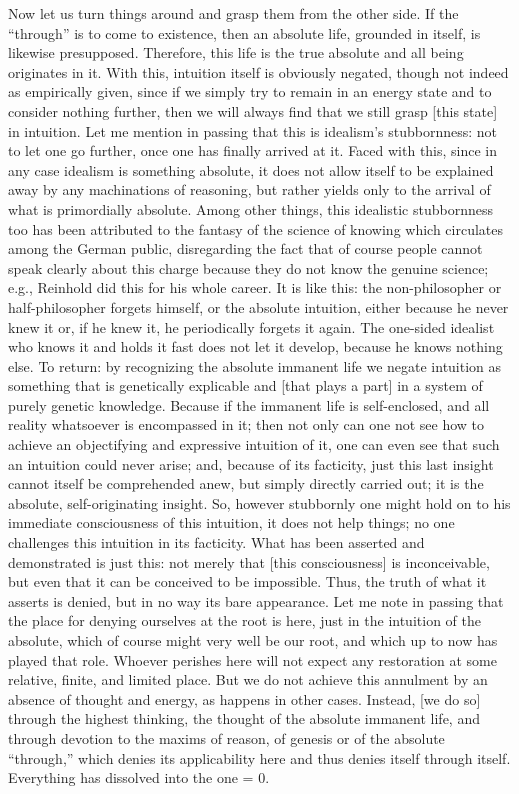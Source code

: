 Now let us turn things around
and grasp them from the other side.
If the “through” is to come to existence,
then an absolute life, grounded in itself,
is likewise presupposed.
Therefore, this life is the true absolute
and all being originates in it.
With this, intuition itself is obviously negated,
though not indeed as empirically given,
since if we simply try to remain in an energy state
and to consider nothing further,
then we will always find that we still grasp
[this state] in intuition.
Let me mention in passing that
this is idealism's stubbornness:
not to let one go further,
once one has finally arrived at it.
Faced with this, since in any case
idealism is something absolute,
it does not allow itself to be explained away
by any machinations of reasoning,
but rather yields only to the arrival
of what is primordially absolute.
Among other things, this idealistic stubbornness too has been
attributed to the fantasy of the science of knowing
which circulates among the German public,
disregarding the fact that of course
people cannot speak clearly about this charge
because they do not know the genuine science;
e.g., Reinhold did this for his whole career.
It is like this:
the non-philosopher or half-philosopher forgets himself,
or the absolute intuition, either because he never knew it
or, if he knew it, he periodically forgets it again.
The one-sided idealist who knows it and holds it fast
does not let it develop, because he knows nothing else.
To return:
by recognizing the absolute immanent life
we negate intuition as something that is genetically explicable
and [that plays a part] in a system of purely genetic knowledge.
Because if the immanent life is self-enclosed,
and all reality whatsoever is encompassed in it;
then not only can one not see how to achieve
an objectifying and expressive intuition of it,
one can even see that such an intuition could never arise;
and, because of its facticity, just this last insight
cannot itself be comprehended anew,
but simply directly carried out;
it is the absolute, self-originating insight.
So, however stubbornly one might hold on
to his immediate consciousness of this intuition,
it does not help things;
no one challenges this intuition in its facticity.
What has been asserted and demonstrated is just this:
not merely that [this consciousness] is inconceivable,
but even that it can be conceived to be impossible.
Thus, the truth of what it asserts is denied,
but in no way its bare appearance.
Let me note in passing that the place
for denying ourselves at the root is here,
just in the intuition of the absolute,
which of course might very well be our root,
and which up to now has played that role.
Whoever perishes here will not expect
any restoration at some relative, finite, and limited place.
But we do not achieve this annulment
by an absence of thought and energy,
as happens in other cases.
Instead, [we do so] through the highest thinking,
the thought of the absolute immanent life,
and through devotion to the maxims of reason,
of genesis or of the absolute “through,”
which denies its applicability here
and thus denies itself through itself.
Everything has dissolved into the one = 0.

